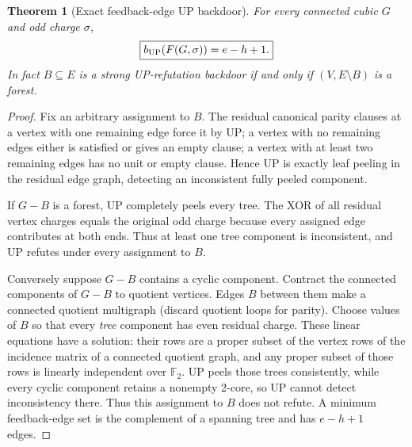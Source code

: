 \documentclass[11pt]{article}
\newtheorem{theorem}{Theorem}
\begin{document}
\begin{theorem}[Exact feedback-edge UP backdoor]
For every connected cubic $G$ and odd charge $\sigma$,
\[
\boxed{b_{\rm UP}(F(G,\sigma))=e-h+1.}
\]
In fact $B\subseteq E$ is a strong UP-refutation backdoor if and only if $(V,E\setminus B)$ is a forest.
\end{theorem}
\begin{proof}
Fix an arbitrary assignment to $B$. The residual canonical parity clauses at a vertex with one remaining edge force it by UP; a vertex with no remaining edges either is satisfied or gives an empty clause; a vertex with at least two remaining edges has no unit or empty clause. Hence UP is exactly leaf peeling in the residual edge graph, detecting an inconsistent fully peeled component.

If $G-B$ is a forest, UP completely peels every tree. The XOR of all residual vertex charges equals the original odd charge because every assigned edge contributes at both ends. Thus at least one tree component is inconsistent, and UP refutes under every assignment to $B$.

Conversely suppose $G-B$ contains a cyclic component. Contract the connected components of $G-B$ to quotient vertices. Edges $B$ between them make a connected quotient multigraph (discard quotient loops for parity). Choose values of $B$ so that every \emph{tree} component has even residual charge. These linear equations have a solution: their rows are a proper subset of the vertex rows of the incidence matrix of a connected quotient graph, and any proper subset of those rows is linearly independent over $\mathbb F_2$. UP peels those trees consistently, while every cyclic component retains a nonempty 2-core, so UP cannot detect inconsistency there. Thus this assignment to $B$ does not refute. A minimum feedback-edge set is the complement of a spanning tree and has $e-h+1$ edges.
\end{proof}
\end{document}
